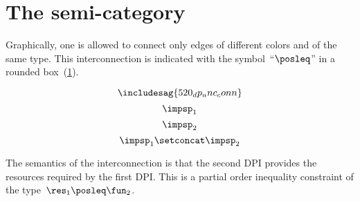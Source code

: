 

\section{The semi-category \DPI}


Graphically, one is allowed to connect only edges of different colors and of the same type.
This interconnection is indicated with the symbol~``$\posleq$'' in a rounded box~(\cref{fig:connection}).

\begin{figure}[h]
  \centering
  \caption{\label{fig:connection}}
\end{figure}

\begin{equation}
  \label{eq:dp_conn}
  \includesag{520_dp_unc_conn}
\end{equation}
\begin{equation}
  \label{eq:impsp1}
  \impsp_1
\end{equation}
\begin{equation}
  \label{eq:impsp2}
  \impsp_2
\end{equation}
\begin{equation}\label{eq:impsp12}
\impsp_{1} \setconcat \impsp_{2}
\end{equation}

The semantics of the interconnection is that the second DPI provides the resources required by the first DPI.
This is a partial order inequality constraint of the type~$\res_{1}\posleq\fun_{2}$.



